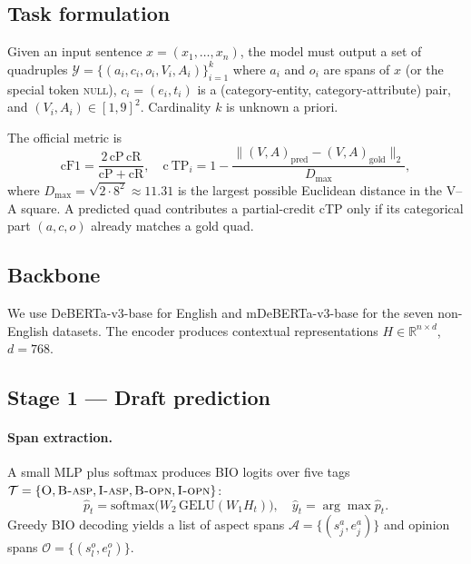 \documentclass[11pt]{article}
\begin{document}
\subsection{Task formulation}
\label{sec:method:task}

Given an input sentence $x = (x_1, \dots, x_n)$, the model must output
a set of quadruples $\mathcal{Y}=\{(a_i, c_i, o_i, V_i, A_i)\}_{i=1}^k$
where $a_i$ and $o_i$ are spans of $x$ (or the special token
\textsc{null}), $c_i = (e_i, t_i)$ is a (category-entity,
category-attribute) pair, and $(V_i,A_i)\in[1,9]^2$. Cardinality $k$
is unknown a priori.

The official metric is
\begin{equation}
\mathrm{cF1} = \frac{2\, \mathrm{cP}\, \mathrm{cR}}{\mathrm{cP}+\mathrm{cR}},
\quad
\mathrm{c\!\:TP}_i = 1 - \frac{\| (V,A)_{\text{pred}} - (V,A)_{\text{gold}} \|_2}{D_{\max}},
\label{eq:cf1}
\end{equation}
where $D_{\max}=\sqrt{2\cdot 8^2}\!\approx\!11.31$ is the largest
possible Euclidean distance in the V--A square. A predicted quad
contributes a partial-credit cTP only if its categorical part
$(a, c, o)$ already matches a gold quad.

\subsection{Backbone}
\label{sec:method:backbone}

We use DeBERTa-v3-base \cite{he2023deberta} for English and
mDeBERTa-v3-base for the seven non-English datasets. The encoder
produces contextual representations $H \in \mathbb{R}^{n\times d}$,
$d=768$.

\subsection{Stage 1 — Draft prediction}
\label{sec:method:stage1}

\paragraph{Span extraction.}
A small MLP plus softmax produces BIO logits over five tags
$\mathcal{T}=\{\textsc{O}, \textsc{B-asp}, \textsc{I-asp},
\textsc{B-opn}, \textsc{I-opn}\}$:
\begin{equation}
\hat p_t = \mathrm{softmax}\big(W_2\,\mathrm{GELU}(W_1 H_t)\big),\quad
\hat y_t = \arg\max \hat p_t.
\end{equation}
Greedy BIO decoding yields a list of aspect spans
$\mathcal{A} = \{(s^a_j, e^a_j)\}$ and opinion spans
$\mathcal{O} = \{(s^o_l, e^o_l)\}$.
\end{document}
